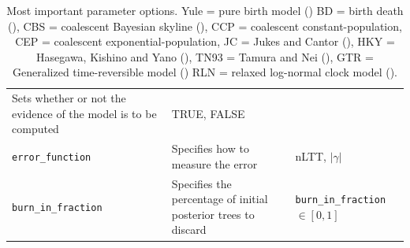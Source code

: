 \begin{table}
\begin{tabular}{|p{3.4cm}|p{9.7cm}|p{4.5cm}@{}|}
    Sets whether or not the evidence of the model is to be computed &
    TRUE, FALSE \\
    \verb;error_function; &
    Specifies how to measure the error &
    nLTT, $|\gamma|$ \\
    \verb;burn_in_fraction; &
    Specifies the percentage of initial posterior trees to discard &
    \verb;burn_in_fraction; $\in [0, 1]$\\
    \hline
  \end{tabular}
  \caption{
    Most important parameter options.
    Yule = pure birth model (\cite{yule})
    BD = birth death (\cite{nee1994reconstructed}), 
    CBS = coalescent Bayesian skyline (\cite{drummond2005bayesian}), 
    CCP = coalescent constant-population, 
    CEP = coalescent exponential-population,
    JC = Jukes and Cantor (\cite{jukes1969evolution}), 
    HKY = Hasegawa, Kishino and Yano (\cite{hasegawa1985dating}), 
    TN93 = Tamura and Nei (\cite{tamura1993estimation}), 
    GTR = Generalized time-reversible model (\cite{tavare1986some})
    RLN = relaxed log-normal clock model (\cite{drummond2006relaxed}).
  }
  \label{tab:options}
\bigskip


\end{table}
